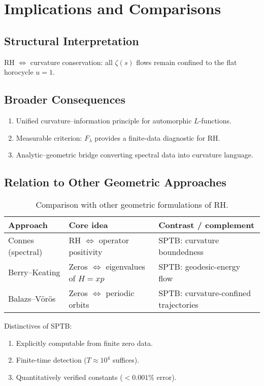 \section{Implications and Comparisons}

\subsection{Structural Interpretation}

RH $\Leftrightarrow$ curvature conservation:
all $\zeta(s)$ flows remain confined to the flat horocycle $u=1$.

\subsection{Broader Consequences}

\begin{enumerate}
\item Unified curvature–information principle for automorphic $L$-functions.
\item Measurable criterion: $F_\lambda$ provides a finite-data diagnostic for RH.
\item Analytic–geometric bridge converting spectral data into curvature language.
\end{enumerate}

\subsection{Relation to Other Geometric Approaches}

\begin{table}[h]
\centering
\caption{Comparison with other geometric formulations of RH.}
\begin{tabular}{lll}
\toprule
Approach & Core idea & Contrast / complement \\
\midrule
Connes (spectral) & RH $\Leftrightarrow$ operator positivity &
SPTB: curvature boundedness \\
Berry–Keating & Zeros $\Leftrightarrow$ eigenvalues of $H=xp$ &
SPTB: geodesic-energy flow \\
Balazs–Vörös & Zeros $\Leftrightarrow$ periodic orbits &
SPTB: curvature-confined trajectories \\
\bottomrule
\end{tabular}
\end{table}

Distinctives of SPTB:
\begin{enumerate}
\item Explicitly computable from finite zero data.
\item Finite-time detection ($T\approx10^4$ suffices).
\item Quantitatively verified constants ($<0.001\%$ error).
\end{enumerate}

